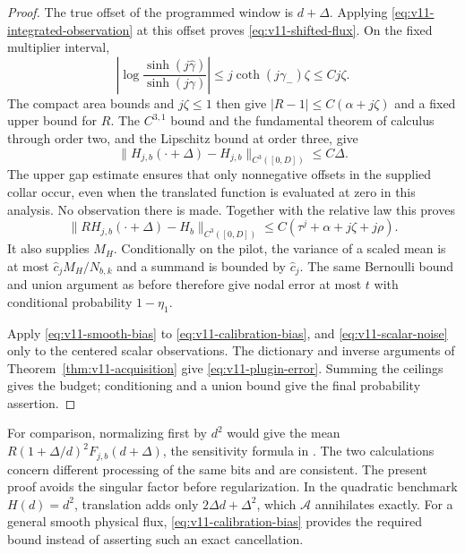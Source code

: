\begin{proof}
The true offset of the programmed window is $d+\Delta$. Applying
\eqref{eq:v11-integrated-observation} at this offset proves
\eqref{eq:v11-shifted-flux}. On the fixed multiplier interval,
\[
 \left|\log\frac{\sinh(j\widehat\gamma)}{\sinh(j\gamma)}\right|
 \le j\coth(j\gamma_-)\zeta\le Cj\zeta.
\]
The compact area bounds and $j\zeta\le1$ then give
$|R-1|\le C(\alpha+j\zeta)$ and a fixed upper bound for $R$.
The $C^{3,1}$ bound and the fundamental theorem of calculus through
order two, and the Lipschitz bound at order three, give
\[
 \|H_{j,b}(\cdot+\Delta)-H_{j,b}\|_{C^3([0,D])}
                                                   \le C\Delta.
\]
The upper gap estimate ensures that only nonnegative offsets in the
supplied collar occur, even when the translated function is evaluated
at zero in this analysis. No observation there is made. Together with
the relative law this proves
\begin{equation}\label{eq:v11-calibration-bias}
 \|R H_{j,b}(\cdot+\Delta)-H_b\|_{C^3([0,D])}
                         \le C(\tau^j+\alpha+j\zeta+j\rho).
\end{equation}
It also supplies $M_H$. Conditionally on the pilot, the variance of
a scaled mean is at most $\widehat c_jM_H/N_{b,k}$ and a summand
is bounded by $\widehat c_j$. The same Bernoulli bound and union
argument as before therefore give nodal error at most $t$ with
conditional probability $1-\eta_1$.

Apply \eqref{eq:v11-smooth-bias} to
\eqref{eq:v11-calibration-bias}, and
\eqref{eq:v11-scalar-noise} only to the centered scalar observations.
The dictionary and inverse arguments of
Theorem~\ref{thm:v11-acquisition} give
\eqref{eq:v11-plugin-error}. Summing the ceilings gives the budget;
conditioning and a union bound give the final probability assertion.
\end{proof}

For comparison, normalizing first by $d^2$ would give the mean
$R(1+\Delta/d)^2F_{j,b}(d+\Delta)$, the sensitivity formula in
\cite{A2ReviewV10}. The two calculations concern different processing
of the same bits and are consistent. The present proof avoids the
singular factor before regularization. In the quadratic benchmark
$H(d)=d^2$, translation adds only $2\Delta d+\Delta^2$, which
$\mathscr A$ annihilates exactly. For a general smooth physical flux,
\eqref{eq:v11-calibration-bias} provides the required bound instead
of asserting such an exact cancellation.


